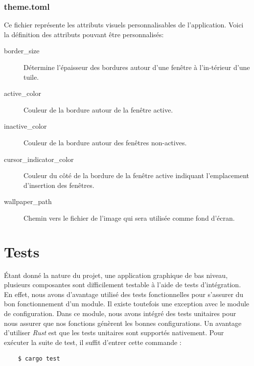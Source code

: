 \documentclass[titlepage]{article}
\begin{document}
\subsubsection{theme.toml}
\begin{minipage}{\linewidth}
	
\end{minipage}

\par
Ce fichier représente les attributs visuels personnalisables de l'application. Voici la définition des attributs pouvant être personnalisés:
\begin{description}
	\item [border\_size] Détermine l'épaisseur des bordures autour d'une fenêtre à l'in-térieur d'une tuile.
	\item [active\_color] Couleur de la bordure autour de la fenêtre active.
	\item [inactive\_color] Couleur de la bordure autour des fenêtres non-actives.
	\item [cursor\_indicator\_color] Couleur du côté de la bordure de la fenêtre active indiquant l'emplacement d'insertion des fenêtres.
	\item [wallpaper\_path] Chemin vers le fichier de l'image qui sera utilisée comme fond d'écran.
\end{description}

\section{Tests}
Étant donné la nature du projet, une application graphique de bas niveau, plusieurs composantes sont difficilement testable à l'aide de tests d'intégration. En effet, nous avons d'avantage utilisé des tests fonctionnelles pour s'assurer du bon fonctionnement d'un module. Il existe toutefois une exception avec le module de configuration. Dans ce module, nous avons intégré des tests unitaires pour nous assurer que nos fonctions génèrent les bonnes configurations. Un avantage d'utiliser \textit{Rust} est que les tests unitaires sont supportés nativement. Pour exécuter la suite de test, il suffit d'entrer cette commande :
\begin{verbatim}
	$ cargo test
\end{verbatim}
\end{document}

